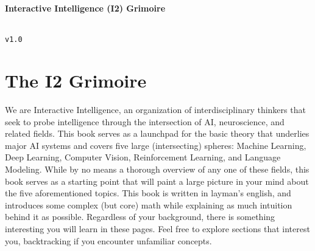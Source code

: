 \documentclass{article}
\begin{document}
\noindent\colorbox{neuripscolor}{
  \parbox{\textwidth}{
    \color{white}
    \vspace{0.5cm}
    \centering
    \LARGE\textbf{Interactive Intelligence (I2) Grimoire}
    \vspace{0.5cm}
  }
}

\vspace{2cm} %

\\
\texttt{v1.0} %
\newpage

\begingroup
\section*{The I2 Grimoire}
We are Interactive Intelligence, an organization of interdisciplinary
thinkers that seek to probe intelligence through the intersection of
AI, neuroscience, and related fields. This book serves as a launchpad
for the basic theory that underlies major AI systems and covers five
large (intersecting) spheres: Machine Learning, Deep Learning,
Computer Vision, Reinforcement Learning, and Language Modeling. While
by no means a thorough overview of any one of these fields, this book
serves as a starting point that will paint a large picture in your
mind about the five aforementioned topics. This book is written in
layman's english, and introduces some complex (but core) math while
explaining as much intuition behind it as possible. Regardless of
your background, there is something interesting you will learn in
these pages. Feel free to explore sections that interest you,
backtracking if you encounter unfamiliar concepts.
\end{document}
